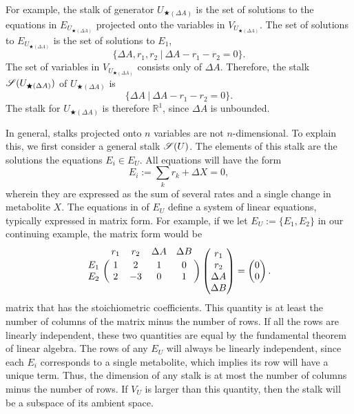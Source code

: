 \documentclass{article}
\begin{document}
For example, the stalk of generator $U_{\bigstar(\Delta A)}$ is the set of
solutions to the equations in $E_{U_{\bigstar(\Delta A)}}$ projected onto the
variables in $V_{U_{\bigstar(\Delta A)}}$. The set of solutions to
$E_{U_{\bigstar(\Delta A)}}$ is the set of solutions to $E_1$,
\begin{equation}
	\{\Delta A, r_1, r_2 \:|\: \Delta A -r_1 - r_2  = 0 \}.
\end{equation}
The set of variables in  $V_{U_{\bigstar(\Delta A)}}$ consists only of $\Delta
A$. Therefore, the stalk $\mathscr{S}(U_{\bigstar(\Delta A)})$ of $U_{\bigstar(\Delta
A)}$ is
\begin{equation}
	\{\Delta A \: | \: \Delta A -r_1 - r_2  = 0 \}.
\end{equation}
The stalk for $U_{\bigstar(\Delta A)}$ is therefore $\mathbb{R}^1$, since
$\Delta A$ is unbounded.

In general, stalks projected onto $n$ variables are not $n$-dimensional. To
explain this, we first consider a general stalk $\mathscr{S}(U)$. The elements of this
stalk are the solutions the equations $E_i \in E_U$. All equations will have
the form
\begin{equation} 
E_i := \sum_{k} r_k + \Delta X  = 0,
\end{equation}
wherein they are expressed as the sum of several rates and a single change in
metabolite $X$. The equations in of $E_U$ define a system of linear equations,
typically expressed in matrix form. For example, if we let $E_U := \{E_1,
E_2\}$ in our continuing example, the matrix form would be 
\begin{equation}
\bordermatrix{
  ~  & r_1 & r_2 & \Delta A & \Delta B \cr
E_1 & 1  & 2  &  1       &  0 \cr
E_2 & 2  & -3   &  0       &  1\cr
} \begin{pmatrix} r_1 \\ r_2 \\ \Delta A \\ \Delta B \end{pmatrix} = \begin{pmatrix} 
 0 \\ 0
 \end{pmatrix}.
\end{equation}
matrix that has the stoichiometric coefficients. This quantity is at least the
number of columns of the matrix minus the number of rows. If all the rows are
linearly independent, these two quantities are equal by the fundamental theorem
of linear algebra. The rows of any $E_U$ will always be linearly independent,
since each $E_i$ corresponds to a single metabolite, which implies its row will
have a unique term. Thus, the dimension of any stalk is at most the number of
columns minus the number of rows. If $V_U$ is larger than this quantity, then
the stalk will be a subspace of its ambient space.
\end{document}
